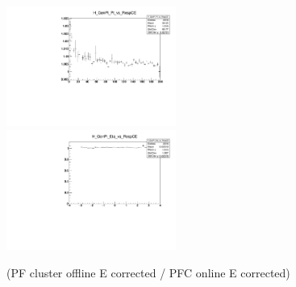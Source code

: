 \begin{figure}
\includegraphics[width=0.495\textwidth]{./plots_pdf/ECAL_plots/Prod6/NoPU/H_GenPi_Pt_vs_RespCE.pdf}
\includegraphics[width=0.495\textwidth]{./plots_pdf/ECAL_plots/Prod6/NoPU/H_GenPi_Eta_vs_RespCE.pdf}
\caption{(PF cluster offline E corrected / PFC online E corrected)}
\end{figure}                                                                                                                                                                       


